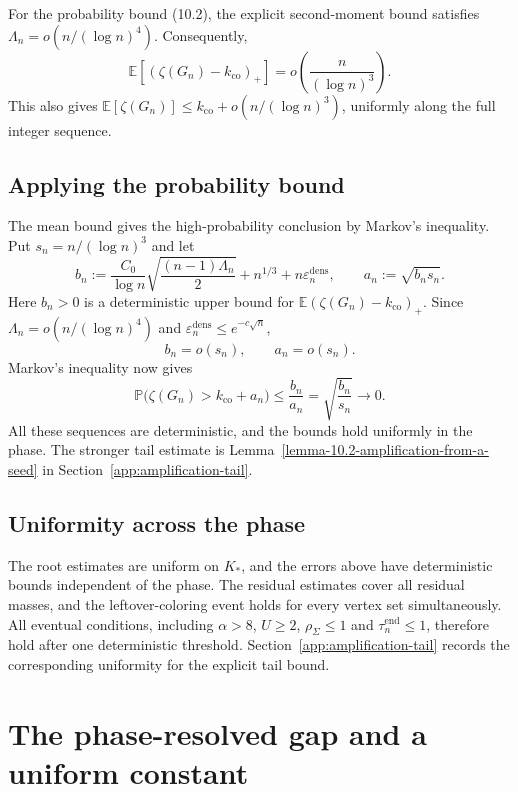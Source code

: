 \documentclass[a4paper,10pt,reqno]{amsart}
\numberwithin{equation}{section}
\newcommand{\Exp}[1]{\mathbb{E}\!\left[#1\right]}
\theoremstyle{plain}
\theoremstyle{remark}
\begin{document}
For the probability bound (10.2), the explicit second-moment bound satisfies
$\Lambda_n=o(n/(\log n)^4)$. Consequently,
\[
 \Exp{(\zeta(G_n)-k_{\mathrm{co}})_+}
 =o\!\left(\frac n{(\log n)^3}\right).
\]
This also gives $\Exp{\zeta(G_n)}\le k_{\mathrm{co}}+o(n/(\log n)^3)$,
uniformly along the full integer sequence.

\subsection*{Applying the probability bound}
The mean bound gives the high-probability conclusion by Markov's inequality.
Put \(s_n=n/(\log n)^3\) and let
\[
 b_n:=\frac{C_0}{\log n}\sqrt{\frac{(n-1)\Lambda_n}{2}}
       +n^{1/3}+n\varepsilon_n^{\mathrm{dens}},
 \qquad a_n:=\sqrt{b_ns_n}.
 \tag{10.7}\label{eq:amplification-markov-scales}
\]
Here \(b_n>0\) is a deterministic upper bound for
\(\mathbb E(\zeta(G_n)-k_{\mathrm{co}})_+\).
Since \(\Lambda_n=o(n/(\log n)^4)\) and
\(\varepsilon_n^{\mathrm{dens}}\le e^{-c\sqrt n}\),
\[
 b_n=o(s_n),\qquad a_n=o(s_n).
 \tag{10.8}\label{eq:amplification-markov-errors}
\]
Markov's inequality now gives
\[
 \mathbb P\bigl(\zeta(G_n)>k_{\mathrm{co}}+a_n\bigr)
 \le\frac{b_n}{a_n}=\sqrt{\frac{b_n}{s_n}}\longrightarrow0.
 \tag{10.9}\label{eq:amplification-markov-probability}
\]
All these sequences are deterministic, and the bounds hold uniformly in the
phase. The stronger tail estimate is
Lemma~\ref{lemma-10.2-amplification-from-a-seed} in
Section~\ref{app:amplification-tail}.

\subsection*{Uniformity across the phase}
\label{subsec:uniformity-phase}

The root estimates are uniform on $K_*$, and the errors above have
deterministic bounds independent of the phase. The residual estimates
cover all residual masses, and the leftover-coloring event holds for
every vertex set simultaneously. All eventual conditions, including
$\alpha>8$, $U\ge2$, $\rho_{\Sigma}\le1$ and
$\tau_n^{\mathrm{end}}\le1$, therefore hold after one deterministic
threshold. Section~\ref{app:amplification-tail} records the corresponding
uniformity for the explicit tail bound.

\section{The phase-resolved gap and a uniform constant}
\label{sec:final-assembly}
\end{document}
